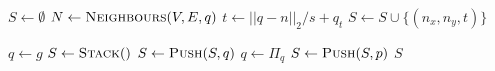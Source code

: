 \begin{algorithm}[ht]
    \caption{$\Function{GetTemporalNeighbours}(V, E, q)$}
    \label{algo:neighbours}
    \begin{algorithmic}[1]
        \setcounter{ALC@line}{0}
        \vspace*{1mm}
        \STATE $S \leftarrow \emptyset$
        \STATE $N \leftarrow \Function{Neighbours}(V, E, q)$
            \STATE $t \leftarrow ||q - n||_2 / s + q_t$
            \STATE $S \leftarrow S \cup \{(n_x, n_y, t)\}$
        \ENDFOR
    \end{algorithmic}
\end{algorithm}

\begin{algorithm}[ht]
    \caption{$\Function{BacktrackPath}(p, g, \Pi)$}
    \label{algo:backtrack}
    \begin{algorithmic}[1]
        \setcounter{ALC@line}{0}
        \vspace*{1mm}
        \STATE $q \leftarrow g$
        \STATE $S \leftarrow \Function{Stack}()$
            \STATE $S \leftarrow \Function{Push}(S, q)$
            \STATE $q \leftarrow \Pi_q$
        \ENDWHILE
        \STATE $S \leftarrow \Function{Push}(S, p)$
        \RETURN $S$
    \end{algorithmic}
\end{algorithm}
